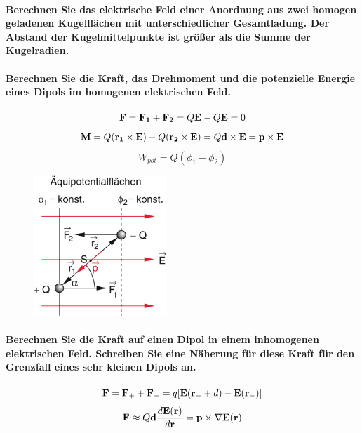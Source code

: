 \documentclass[a4paper, 11pt, parskip=half]{scrartcl}
\begin{document}
\paragraph{Berechnen Sie das elektrische Feld einer Anordnung aus zwei homogen geladenen
Kugelflächen mit unterschiedlicher Gesamtladung. Der Abstand der Kugelmittelpunkte ist
größer als die Summe der Kugelradien.}

\paragraph{Berechnen Sie die Kraft, das Drehmoment und die potenzielle Energie eines Dipols im
homogenen elektrischen Feld.}

\begin{equation}
    \bold{F} = \bold{F_1} + \bold{F_2} = Q\bold{E} - Q\bold{E} = 0
\end{equation}
\begin{equation}
    \bold{M}
    = Q (\bold{r_1} \times \bold{E}) - Q (\bold{r_2} \times \bold{E})
    = Q \bold{d} \times \bold{E}
    = \bold{p} \times \bold{E}
\end{equation}
\begin{equation}
    W_{pot} = Q (\phi_1 - \phi_2)
\end{equation}

\begin{figure}[H]
    \centering
    \includegraphics[width=5cm]{image/1/13}
\end{figure}

\paragraph{Berechnen Sie die Kraft auf einen Dipol in einem inhomogenen elektrischen Feld. Schreiben
Sie eine Näherung für diese Kraft für den Grenzfall eines sehr kleinen Dipols an.}

\begin{equation}
    \bold{F} = \bold{F_+} + \bold{F_-} = q [ \bold{E} (\bold{r_-} + d) - \bold{E(r_-)}]
\end{equation}
\begin{equation}
    \bold{F} \approx Q \bold{d} \frac{d\bold{E(r)}}{d\bold{r}} = \bold{p} \times \nabla \bold{E(r)}
\end{equation}
\end{document}
